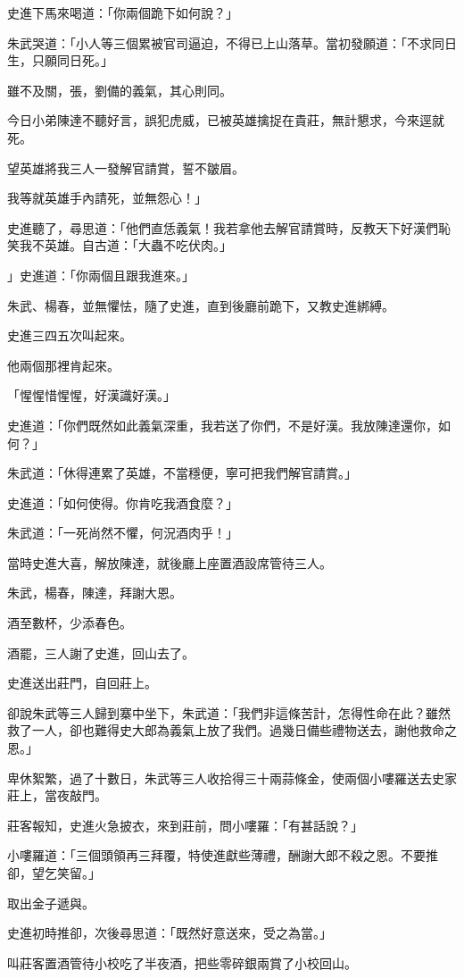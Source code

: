 \documentclass[11pt,a4paper]{article}
\begin{document}
史進下馬來喝道：「你兩個跪下如何說？」

朱武哭道：「小人等三個累被官司逼迫，不得已上山落草。當初發願道：「不求同日生，只願同日死。」

雖不及關，張，劉備的義氣，其心則同。

今日小弟陳達不聽好言，誤犯虎威，已被英雄擒捉在貴莊，無計懇求，今來逕就死。

望英雄將我三人一發解官請賞，誓不皺眉。

我等就英雄手內請死，並無怨心！」

史進聽了，尋思道：「他們直恁義氣！我若拿他去解官請賞時，反教天下好漢們恥笑我不英雄。自古道：「大蟲不吃伏肉。」

」史進道：「你兩個且跟我進來。」

朱武、楊春，並無懼怯，隨了史進，直到後廳前跪下，又教史進綁縛。

史進三四五次叫起來。

他兩個那裡肯起來。

「惺惺惜惺惺，好漢識好漢。」

史進道：「你們既然如此義氣深重，我若送了你們，不是好漢。我放陳達還你，如何？」

朱武道：「休得連累了英雄，不當穩便，寧可把我們解官請賞。」

史進道：「如何使得。你肯吃我酒食麼？」

朱武道：「一死尚然不懼，何況酒肉乎！」

當時史進大喜，解放陳達，就後廳上座置酒設席管待三人。

朱武，楊春，陳達，拜謝大恩。

酒至數杯，少添春色。

酒罷，三人謝了史進，回山去了。

史進送出莊門，自回莊上。

卻說朱武等三人歸到寨中坐下，朱武道：「我們非這條苦計，怎得性命在此？雖然救了一人，卻也難得史大郎為義氣上放了我們。過幾日備些禮物送去，謝他救命之恩。」

卑休絮繁，過了十數日，朱武等三人收拾得三十兩蒜條金，使兩個小嘍羅送去史家莊上，當夜敲門。

莊客報知，史進火急披衣，來到莊前，問小嘍羅：「有甚話說？」

小嘍羅道：「三個頭領再三拜覆，特使進獻些薄禮，酬謝大郎不殺之恩。不要推卻，望乞笑留。」

取出金子遞與。

史進初時推卻，次後尋思道：「既然好意送來，受之為當。」

叫莊客置酒管待小校吃了半夜酒，把些零碎銀兩賞了小校回山。
\end{document}
